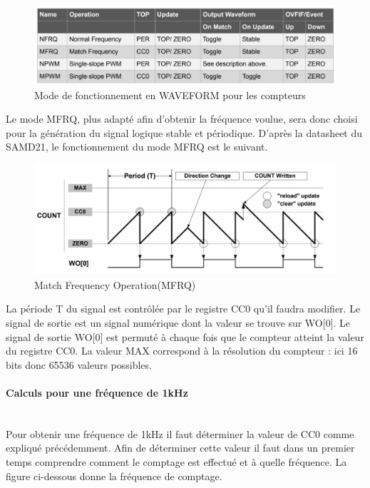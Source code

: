 \documentclass[a4paper]{article}
\begin{document}
\begin{figure}[htbp]
\centering
\includegraphics[width=12cm]{figure/mode Waveform.jpg}
\caption{Mode de fonctionnement en WAVEFORM pour les compteurs}
\label{pic1}
\end{figure}

Le mode MFRQ, plus adapté afin d'obtenir la fréquence voulue, sera donc choisi pour la génération du signal logique stable et périodique. D'après la datasheet du SAMD21, le fonctionnement du mode MFRQ est le suivant. \\

\begin{figure}[htbp]
\centering
\includegraphics[width=12cm]{figure/Match Frequency Operation.jpg}
\caption{Match Frequency Operation(MFRQ)}
\label{pic2}
\end{figure}

La période T du signal est contrôlée par le registre CC0 qu'il faudra modifier. Le signal de sortie est un signal numérique dont la valeur se trouve sur WO[0]. Le signal de sortie WO[0] est permuté à chaque fois que le compteur atteint la valeur du registre CC0. La valeur MAX correspond à la résolution du compteur : ici 16 bits donc 65536 valeurs possibles. \\

\paragraph{Calculs pour une fréquence de 1kHz}
~~\\
Pour obtenir une fréquence de 1kHz il faut déterminer la valeur de CC0 comme expliqué précédemment. Afin de déterminer cette valeur il faut dans un premier temps comprendre comment le comptage est effectué et à quelle fréquence. La figure ci-dessous donne la fréquence de comptage. \\
\end{document}
